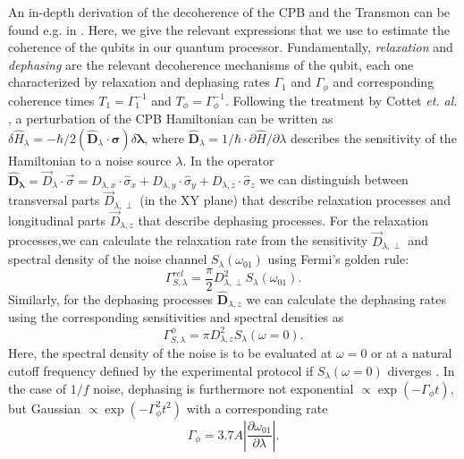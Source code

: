 An in-depth derivation of the decoherence of the CPB and the Transmon can be found e.g. in \citep{cottet_implementation_2002,koch_charge-insensitive_2007}. Here, we give the relevant expressions that we use to estimate the coherence of the qubits in our quantum processor. Fundamentally, {\it relaxation} and {\it dephasing} are the relevant decoherence mechanisms of the qubit, each one characterized by relaxation and dephasing rates $\Gamma_1$ and $\Gamma_\phi$ and corresponding coherence times $T_1=\Gamma_1^{-1}$ and $T_\phi=\Gamma_\phi^{-1}$. Following the treatment by Cottet {\it et. al.} \citep{cottet_implementation_2002}, a perturbation of the CPB Hamiltonian can be written as $\delta \hat{H}_{\lambda}=-\hbar/2(\mathbf{\hat{D}}_\lambda\cdot\mathbf{\sigma})\delta \mathbf{\lambda}$, where $\mathbf{\hat{D}}_\lambda=1/\hbar\cdot \partial \hat{H}/\partial \lambda$ describes the sensitivity of the Hamiltonian to a noise source $\lambda$. In the operator $\mathbf{\hat{D}_\lambda}=\vec{D}_\lambda\cdot \vec{\sigma}=D_{\lambda,x}\cdot\hat{\sigma}_x+D_{\lambda,y}\cdot\hat{\sigma}_y+D_{\lambda,z}\cdot\hat{\sigma}_z$ we can distinguish between transversal parts $\vec{D}_{\lambda,\perp}$ (in the XY plane) that describe relaxation processes and longitudinal parts $\vec{D}_{\lambda,z}$ that describe dephasing processes. For the relaxation processes,we can calculate the relaxation rate from the sensitivity $\vec{D}_{\lambda,\perp}$ and spectral density of the noise channel $S_{\lambda}(\omega_{01})$ using Fermi's golden rule:
%
\begin{equation}
\Gamma^{rel}_{S,\lambda} = \frac{\pi}{2}D_{\lambda,\perp}^2 S_{\lambda}(\omega_{01}). \label{eq:relaxation_rate}
\end{equation}
%
Similarly, for the dephasing processes $\hat{\mathbf{D}}_{\lambda,z}$ we can calculate the dephasing rates using the corresponding sensitivities and spectral densities as
%
\begin{equation}
\Gamma_{S,\lambda}^\phi = \pi D_{\lambda,z}^2 S_{\lambda}(\omega = 0).
\end{equation}
% 
Here, the spectral density of the noise is to be evaluated at $\omega=0$ or at a natural cutoff frequency defined by the experimental protocol if $S_{\lambda}(\omega=0)$ diverges \citep{cottet_implementation_2002}. In the case of $1/f$ noise, dephasing is furthermore not exponential $\propto\exp{(-\Gamma_\phi t)}$, but Gaussian $\propto\exp{(-\Gamma_\phi^2 t^2)}$ with a corresponding rate
%
\begin{equation}
\Gamma_\phi =3.7A \left|\frac{\partial \omega_{01}}{\partial \lambda}\right|.
\end{equation}
